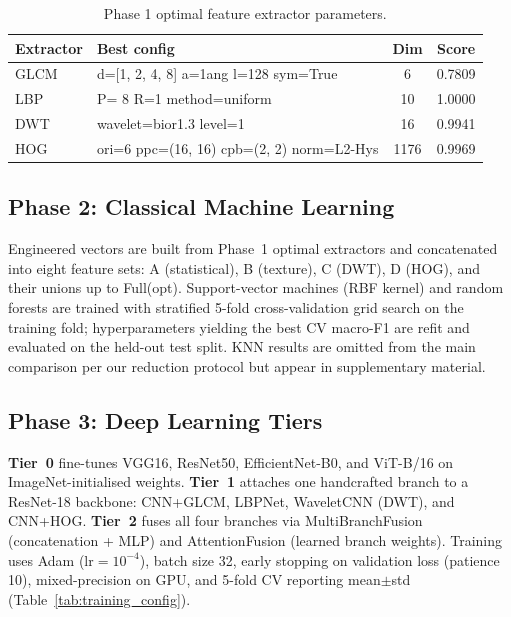 \documentclass[11pt]{article}
\begin{document}
\begin{table}
\centering
\caption{Phase 1 optimal feature extractor parameters.}

\begin{tabular}{@{}llcc@{}}
\hline
Extractor & Best config & Dim & Score \\
\hline
GLCM & d=[1, 2, 4, 8] a=1ang l=128 sym=True & 6 & 0.7809 \\
LBP & P= 8 R=1 method=uniform & 10 & 1.0000 \\
DWT & wavelet=bior1.3  level=1 & 16 & 0.9941 \\
HOG & ori=6 ppc=(16, 16) cpb=(2, 2) norm=L2-Hys & 1176 & 0.9969 \\
\hline
\end{tabular}
\end{table}


\subsection{Phase 2: Classical Machine Learning}

Engineered vectors are built from Phase~1 optimal extractors and concatenated into eight feature sets: A (statistical), B (texture), C (DWT), D (HOG), and their unions up to Full(opt).
Support-vector machines (RBF kernel) and random forests are trained with stratified 5-fold cross-validation grid search on the training fold; hyperparameters yielding the best CV macro-F1 are refit and evaluated on the held-out test split.
KNN results are omitted from the main comparison per our reduction protocol but appear in supplementary material.

\subsection{Phase 3: Deep Learning Tiers}

\textbf{Tier~0} fine-tunes VGG16, ResNet50, EfficientNet-B0, and ViT-B/16 on ImageNet-initialised weights.
\textbf{Tier~1} attaches one handcrafted branch to a ResNet-18 backbone: CNN+GLCM, LBPNet, WaveletCNN (DWT), and CNN+HOG.
\textbf{Tier~2} fuses all four branches via MultiBranchFusion (concatenation + MLP) and AttentionFusion (learned branch weights).
Training uses Adam ($\mathrm{lr}=10^{-4}$), batch size 32, early stopping on validation loss (patience 10), mixed-precision on GPU, and 5-fold CV reporting mean$\pm$std (Table~\ref{tab:training_config}).
\end{document}
